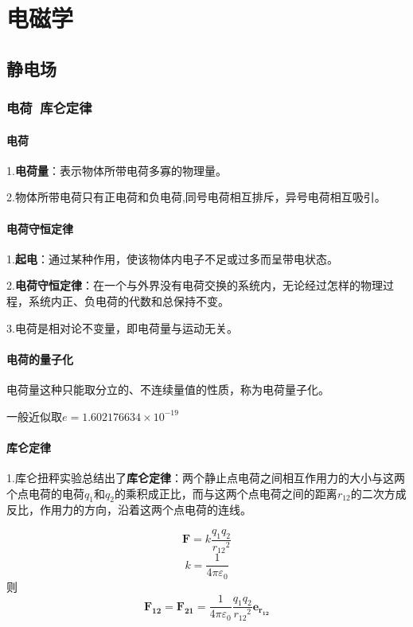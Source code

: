 \part{电磁学}
\chapter{静电场}
\section{电荷~库仑定律}

\subsection{电荷}

1.\textbf{电荷量}：表示物体所带电荷多寡的物理量。

2.物体所带电荷只有正电荷和负电荷,同号电荷相互排斥，异号电荷相互吸引。

\subsection{电荷守恒定律}

1.\textbf{起电}：通过某种作用，使该物体内电子不足或过多而呈带电状态。

2.\textbf{电荷守恒定律}：在一个与外界没有电荷交换的系统内，无论经过怎样的物理过程，系统内正、负电荷的代数和总保持不变。

3.电荷是相对论不变量，即电荷量与运动无关。

\subsection{电荷的量子化}

电荷量这种只能取分立的、不连续量值的性质，称为电荷量子化。

一般近似取$e=1.602176634×10^{-19}$

\subsection{库仑定律}

1.库仑扭秤实验总结出了\textbf{库仑定律}：两个静止点电荷之间相互作用力的大小与这两个点电荷的电荷$q_{1}$和$q_{2}$的乘积成正比，而与这两个点电荷之间的距离$r_{12}$的二次方成反比，作用力的方向，沿着这两个点电荷的连线。

$$\mathbf{F}=k\frac{q_{1}q_{2}}{{r_{12}}^{2}}$$
$$k=\frac{1}{4\pi\varepsilon_{0}}$$
则$$\mathbf{F_{12}}=\mathbf{F_{21}}=\frac{1}{4\pi\varepsilon_{0}}\frac{q_{1}q_{2}}{{r_{12}}^{2}}\mathbf{e_{r_{12}}} $$

